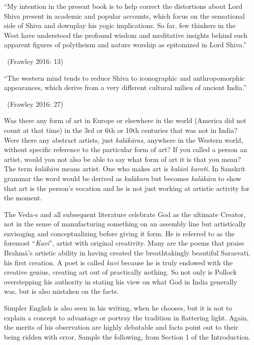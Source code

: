 \begin{myquote}
“My intention in the present book is to help correct the distortions about Lord Shiva present in academic and popular accounts, which focus on the sensational side of Shiva and downplay his yogic implications. So far, few thinkers in the West have understood the profound wisdom and meditative insights behind such apparent figures of polytheism and nature worship as epitomized in Lord Shiva.” 

~\hfill (Frawley 2016: 13)
\end{myquote}

\begin{myquote}
“The western mind tends to reduce Shiva to iconographic and anthropomorphic appearances, which derive from a very different cultural milieu of ancient India.” 

~\hfill (Frawley 2016: 27)
\end{myquote}

Was there any form of art in Europe or elsewhere in the world (America did not count at that time) in the 3rd or 6th or 10th centuries that was not in India? Were there any abstract artists, just \textit{kalākāras}, anywhere in the Western world, without specific reference to the particular form of art? If you called a person an artist, would you not also be able to say what form of art it is that you mean? The term \textit{kalākāra} means artist. One who makes art is \textit{kalāṁ karoti}. In Sanskrit grammar the word would be derived as \textit{kalākara} but becomes \textit{kalākāra} to show that art is the person’s vocation and he is not just working at artistic activity for the moment.

The Veda-s and all subsequent literature celebrate God as the ultimate Creator, not in the sense of manufacturing something on an assembly line but artistically envisaging and conceptualizing before giving it form. He is referred to as the foremost “\textit{Kavi}”, artist with original creativity. Many are the poems that praise Brahmā’s artistic ability in having created the breathtakingly beautiful Sarasvatī, his first creation. A poet is called \textit{kavi} because he is truly endowed with the creative genius, creating art out of practically nothing. So not only is Pollock overstepping his authority in stating his view on what God in India generally was, but is also mistaken on the facts.

Simpler English is also seen in his writing, when he chooses, but it is not to explain a concept to advantage or portray the tradition in flattering light. Again, the merits of his observation are highly debatable and facts point out to their being ridden with error. Sample the following, from Section 1 of the Introduction.

